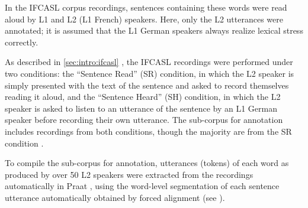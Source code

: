 	In the IFCASL corpus recordings, sentences containing these words were read aloud by L1 and L2 (L1 French) speakers. Here, only the L2 utterances were annotated; it is assumed that the L1 German speakers always realize lexical stress correctly. 
	
	As described in \cref{sec:intro:ifcasl} , the IFCASL recordings were performed under two conditions: the ``Sentence Read'' (SR) condition, in which the L2 speaker is simply  presented with the text of the sentence and asked to record themselves reading it aloud, and the ``Sentence Heard'' (SH) condition, in which the L2 speaker is asked to listen to an utterance of the sentence by an L1 German speaker before recording their own utterance. The sub-corpus for annotation includes recordings from both conditions, though the majority are from the SR condition .
	
	To compile the sub-corpus for annotation, utterances (tokens) of each word as produced by over 50 L2 speakers were extracted from the recordings automatically in Praat \parencite{Boersma2014}, using the word-level segmentation of each sentence utterance automatically obtained by forced alignment (see ).
	
